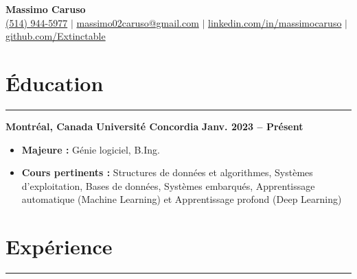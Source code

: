 \documentclass[10pt]{article}
\begin{document}
\newcommand{\fullname}{Massimo Caruso}
\newcommand{\phone}{(514) 944-5977}
\newcommand{\email}{massimo02caruso@gmail.com}
\newcommand{\linkedin}{linkedin.com/in/massimocaruso}
\newcommand{\github}{github.com/Extinctable}

\begin{center}
    {\Huge \textbf{\fullname}} \\
    \vspace{1mm}
    {\small 
    \faPhone \hspace{0mm} \href{tel:+15149445977}{\phone} $\vert$ 
    \faEnvelope \hspace{0mm} \href{mailto:massimo02caruso@gmail.com}{\email} $\vert$ 
    \faLinkedin \hspace{0mm} \href{https://linkedin.com/in/massimocaruso}{\linkedin} $\vert$ 
    \faGithub \hspace{0mm} \href{https://github.com/Extinctable}{\github}
    }
\end{center}

\vspace{-8mm}

\section*{Éducation}
\vspace{-2mm}
\hrule
\vspace{0mm}

\textbf{Montréal, Canada} \hfill \textbf{Université Concordia} \hfill \textbf{Janv. 2023 -- Présent} 
\vspace{-4mm}
\begin{itemize}[left=0.15in, itemsep=0pt]
    \item \textbf{Majeure :} Génie logiciel, B.Ing.
    \item \textbf{Cours pertinents :} Structures de données et algorithmes, Systèmes d'exploitation, Bases de données, Systèmes embarqués, Apprentissage automatique (Machine Learning) et Apprentissage profond (Deep Learning)
\end{itemize}

\vspace{-6mm} %
\section*{Expérience}
\vspace{-2mm}
\hrule
\vspace{0mm}
\end{document}
